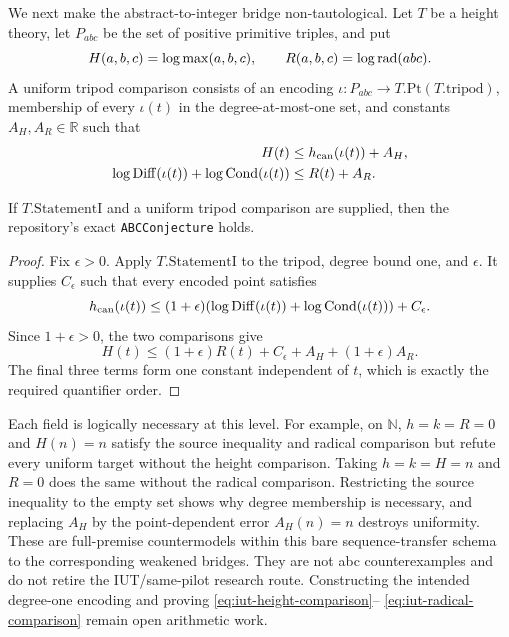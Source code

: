 We next make the abstract-to-integer bridge non-tautological.  Let $T$ be a
height theory, let $P_{abc}$ be the set of positive primitive triples, and put
\[
 H(a,b,c)=\log\max(a,b,c),\qquad
 R(a,b,c)=\log\operatorname{rad}(abc).
\]
A uniform tripod comparison consists of an encoding
$\iota:P_{abc}\to T.\mathrm{Pt}(T.\mathrm{tripod})$, membership of every
$\iota(t)$ in the degree-at-most-one set, and constants $A_H,A_R\in\mathbb R$
such that
\begin{align}
 H(t)&\le h_{\rm can}(\iota(t))+A_H,
 \label{eq:iut-height-comparison}\\
 \log\mathrm{Diff}(\iota(t))+\log\mathrm{Cond}(\iota(t))
 &\le R(t)+A_R.
 \label{eq:iut-radical-comparison}
\end{align}

\begin{theorem}
\label{thm:statementI-integer-transfer}
If $T.\mathrm{StatementI}$ and a uniform tripod comparison are supplied,
then the repository's exact \texttt{ABCConjecture} holds.
\end{theorem}

\begin{proof}
Fix $\epsilon>0$.  Apply $T.\mathrm{StatementI}$ to the tripod, degree bound
one, and $\epsilon$.  It supplies $C_\epsilon$ such that every encoded point
satisfies
\[
 h_{\rm can}(\iota(t))\le(1+\epsilon)
  (\log\mathrm{Diff}(\iota(t))+\log\mathrm{Cond}(\iota(t)))+C_\epsilon.
\]
Since $1+\epsilon>0$, the two comparisons give
\[
 H(t)\le(1+\epsilon)R(t)+
   C_\epsilon+A_H+(1+\epsilon)A_R.
\]
The final three terms form one constant independent of $t$, which is exactly
the required quantifier order.
\end{proof}

Each field is logically necessary at this level.  For example, on
$\mathbb N$, $h=k=R=0$ and $H(n)=n$ satisfy the source inequality and radical
comparison but refute every uniform target without the height comparison.
Taking $h=k=H=n$ and $R=0$ does the same without the radical comparison.
Restricting the source inequality to the empty set shows why degree
membership is necessary, and replacing $A_H$ by the point-dependent error
$A_H(n)=n$ destroys uniformity.  These are full-premise countermodels within
this bare sequence-transfer schema to the corresponding weakened bridges.
They are not abc counterexamples and do not retire the IUT/same-pilot research
route.  Constructing the intended degree-one
encoding and proving \eqref{eq:iut-height-comparison}--
\eqref{eq:iut-radical-comparison} remain open arithmetic work.

